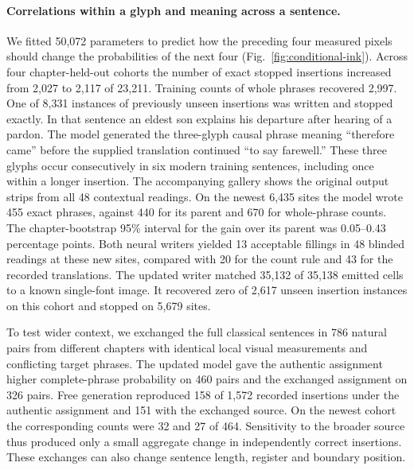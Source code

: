 \documentclass[12pt,a4paper]{article}
\providecommand{\DIFadd}[1]{{\protect\color{blue} \sf #1}} %
\begin{document}
\paragraph{\DIFadd{Correlations within a glyph and meaning across a sentence.}}
\DIFadd{We fitted 50,072 parameters to predict how the preceding four measured pixels should change the probabilities of the next four (Fig.~\ref{fig:conditional-ink}). Across four chapter-held-out cohorts the number of exact stopped insertions increased from 2,027 to 2,117 of 23,211. Training counts of whole phrases recovered 2,997. One of 8,331 instances of previously unseen insertions was written and stopped exactly. In that sentence an eldest son explains his departure after hearing of a pardon. The model generated the three-glyph causal phrase meaning “therefore came” before the supplied translation continued “to say farewell.” These three glyphs occur consecutively in six modern training sentences, including once within a longer insertion. The accompanying gallery shows the original output strips from all 48 contextual readings. On the newest 6,435 sites the model wrote 455 exact phrases, against 440 for its parent and 670 for whole-phrase counts. The chapter-bootstrap 95\% interval for the gain over its parent was 0.05--0.43 percentage points. Both neural writers yielded 13 acceptable fillings in 48 blinded readings at these new sites, compared with 20 for the count rule and 43 for the recorded translations. The updated writer matched 35,132 of 35,138 emitted cells to a known single-font image. It recovered zero of 2,617 unseen insertion instances on this cohort and stopped on 5,679 sites.
}

\DIFadd{To test wider context, we exchanged the full classical sentences in 786 natural pairs from different chapters with identical local visual measurements and conflicting target phrases. The updated model gave the authentic assignment higher complete-phrase probability on 460 pairs and the exchanged assignment on 326 pairs. Free generation reproduced 158 of 1,572 recorded insertions under the authentic assignment and 151 with the exchanged source. On the newest cohort the corresponding counts were 32 and 27 of 464. Sensitivity to the broader source thus produced only a small aggregate change in independently correct insertions. These exchanges can also change sentence length, register and boundary position.
}
\end{document}
